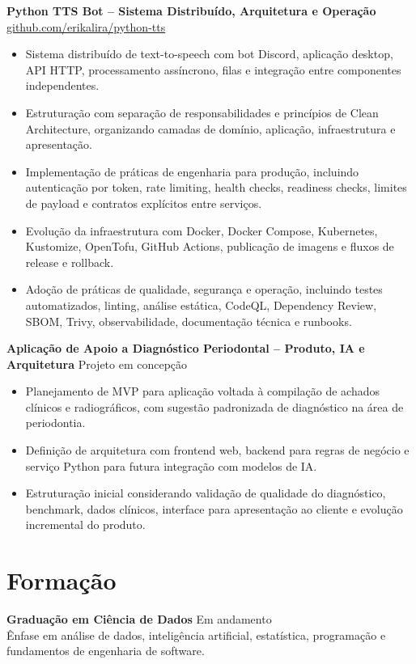 \documentclass[10pt,a4paper]{article}
\begin{document}
\textbf{Python TTS Bot -- Sistema Distribuído, Arquitetura e Operação} \hfill \href{https://github.com/erikalira/python-tts}{github.com/erikalira/python-tts}
\begin{itemize}
  \item Sistema distribuído de text-to-speech com bot Discord, aplicação desktop, API HTTP, processamento assíncrono, filas e integração entre componentes independentes.
  \item Estruturação com separação de responsabilidades e princípios de Clean Architecture, organizando camadas de domínio, aplicação, infraestrutura e apresentação.
  \item Implementação de práticas de engenharia para produção, incluindo autenticação por token, rate limiting, health checks, readiness checks, limites de payload e contratos explícitos entre serviços.
  \item Evolução da infraestrutura com Docker, Docker Compose, Kubernetes, Kustomize, OpenTofu, GitHub Actions, publicação de imagens e fluxos de release e rollback.
  \item Adoção de práticas de qualidade, segurança e operação, incluindo testes automatizados, linting, análise estática, CodeQL, Dependency Review, SBOM, Trivy, observabilidade, documentação técnica e runbooks.
\end{itemize}

\textbf{Aplicação de Apoio a Diagnóstico Periodontal -- Produto, IA e Arquitetura} \hfill Projeto em concepção
\begin{itemize}
  \item Planejamento de MVP para aplicação voltada à compilação de achados clínicos e radiográficos, com sugestão padronizada de diagnóstico na área de periodontia.
  \item Definição de arquitetura com frontend web, backend para regras de negócio e serviço Python para futura integração com modelos de IA.
  \item Estruturação inicial considerando validação de qualidade do diagnóstico, benchmark, dados clínicos, interface para apresentação ao cliente e evolução incremental do produto.
\end{itemize}

\section*{Formação}

\textbf{Graduação em Ciência de Dados} \hfill Em andamento\\
Ênfase em análise de dados, inteligência artificial, estatística, programação e fundamentos de engenharia de software.
\end{document}
